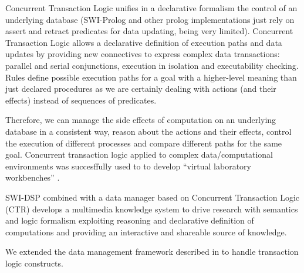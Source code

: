\documentclass[runningheads]{llncs}
\begin{document}
Concurrent Transaction Logic \cite{ctl}  unifies in a declarative formalism the control of an underlying database (SWI-Prolog and other prolog implementations just rely on assert and retract predicates for data updating, being very limited). Concurrent Transaction Logic allows a declarative definition of execution paths and data updates by providing new connectives to express complex data transactions: parallel and serial conjunctions, execution in isolation and executability checking. Rules define possible execution paths for a goal with a higher-level meaning than just declared procedures as we are certainly dealing with actions (and their effects) instead of sequences of predicates.

Therefore, we can manage the side effects of computation on an underlying database in a consistent way, reason about the actions and their effects, control the execution of different processes and compare different paths for the same goal. Concurrent transaction logic applied to complex data/computational environments was succesffully used to to develop ``virtual laboratory workbenches'' \cite{virtual}. 

SWI-DSP combined with a data manager based on Concurrent Transaction Logic (CTR) develops a multimedia knowledge system to drive research with semantics and logic formalism exploiting reasoning and declarative definition of computations and providing an interactive and shareable source of knowledge.

We extended the data management framework described in \cite{UsAES2006} to handle transaction logic constructs.


\end{document}
